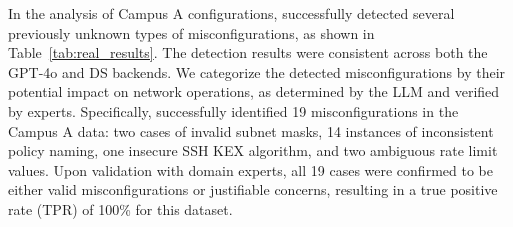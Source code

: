 In the analysis of Campus A configurations, \sysname{} successfully detected several previously unknown types of misconfigurations, as shown in Table~\ref{tab:real_results}. The detection results were consistent across both the GPT-4o and DS backends. We categorize the detected misconfigurations by their potential impact on network operations, as determined by the LLM and verified by experts.
Specifically, \sysname{} successfully identified 19 misconfigurations in the Campus A data: two cases of invalid subnet masks, 14 instances of inconsistent policy naming, one insecure SSH KEX algorithm, and two ambiguous rate limit values. Upon validation with domain experts, all 19 cases were confirmed to be either valid misconfigurations or justifiable concerns, resulting in a true positive rate (TPR) of 100\% for this dataset.

